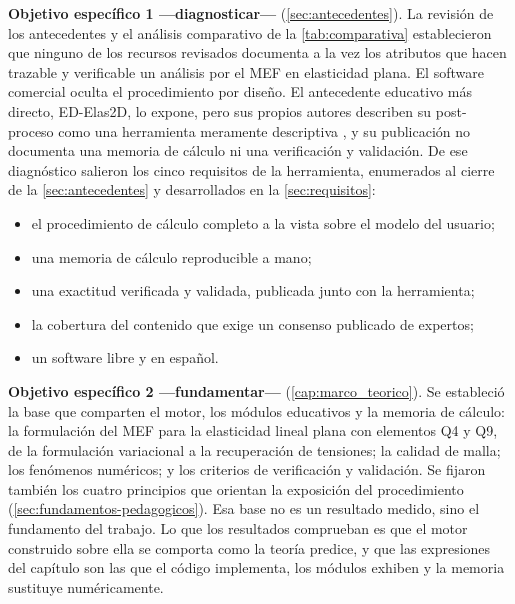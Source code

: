 \textbf{Objetivo específico 1 —diagnosticar—} (\autoref{sec:antecedentes}). La revisión de los antecedentes y el análisis comparativo de la \autoref{tab:comparativa} establecieron que ninguno de los recursos revisados documenta a la vez los atributos que hacen trazable y verificable un análisis por el MEF en elasticidad plana. El software comercial oculta el procedimiento por diseño. El antecedente educativo más directo, ED-Elas2D, lo expone, pero sus propios autores describen su post-proceso como una herramienta meramente descriptiva \autocite[p.~253]{suarez1998edelas2d}, y su publicación no documenta una memoria de cálculo ni una verificación y validación. De ese diagnóstico salieron los cinco requisitos de la herramienta, enumerados al cierre de la \autoref{sec:antecedentes} y desarrollados en la \autoref{sec:requisitos}:
\begin{itemize}
    \item el procedimiento de cálculo completo a la vista sobre el modelo del usuario;
    \item una memoria de cálculo reproducible a mano;
    \item una exactitud verificada y validada, publicada junto con la herramienta;
    \item la cobertura del contenido que exige un consenso publicado de expertos;
    \item un software libre y en español.
\end{itemize}

\textbf{Objetivo específico 2 —fundamentar—} (\autoref{cap:marco_teorico}). Se estableció la base que comparten el motor, los módulos educativos y la memoria de cálculo: la formulación del MEF para la elasticidad lineal plana con elementos Q4 y Q9, de la formulación variacional a la recuperación de tensiones; la calidad de malla; los fenómenos numéricos; y los criterios de verificación y validación. Se fijaron también los cuatro principios que orientan la exposición del procedimiento (\autoref{sec:fundamentos-pedagogicos}). Esa base no es un resultado medido, sino el fundamento del trabajo. Lo que los resultados comprueban es que el motor construido sobre ella se comporta como la teoría predice, y que las expresiones del capítulo son las que el código implementa, los módulos exhiben y la memoria sustituye numéricamente.

